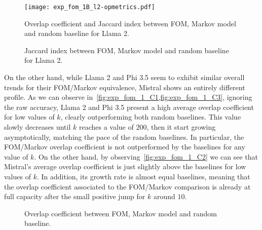 \begin{figure}[t!]
    \centering
    \texttt{[image: exp\_fom\_1B\_l2-opmetrics.pdf]}
    \caption[Overlap coefficient and Jaccard index for Llama 2.]{Overlap coefficient and Jaccard index between FOM, Markov model and random baseline for Llama 2.}
    \label{fig:exp_fom_1_B1}
\end{figure}
\begin{figure}[t!]
    \caption[Jaccard index for Llama 2 considering FOM and FOM with RMS.]{Jaccard index between FOM, Markov model and random baseline for Llama 2.}
    \label{fig:exp_fom_1_B}
\end{figure}

On the other hand,  while Llama 2 and Phi 3.5 seem to exhibit similar overall trends for their FOM/Markov equivalence, Mistral shows an entirely different profile.
As we can observe in~\cref{fig:exp_fom_1_C1,fig:exp_fom_1_C3}, ignoring the raw accuracy, Llama 2 and Phi 3.5 present a high average overlap coefficient for low values of $k$, clearly outperforming both random baselines.
This value slowly decreases until $k$ reaches a value  of $200$, then it start growing asymptotically, matching the pace of the random baselines.
In particular, the FOM/Markov overlap coefficient is not outperformed by the baselines for any value of $k$.
On the other hand, by observing~\cref{fig:exp_fom_1_C2} we can see that Mistral's average overlap coefficient is just slightly above the baselines for low values of $k$.
In addition, its growth rate is almost equal  baselines, meaning that the overlap coefficient associated to the FOM/Markov comparison is already at full capacity after the small positive jump for $k$ around $10$.

\begin{figure}[t!]
    \centering
    \caption{Overlap coefficient between FOM, Markov model and random baseline.}
    \label{fig:exp_fom_1_C}
\end{figure}

